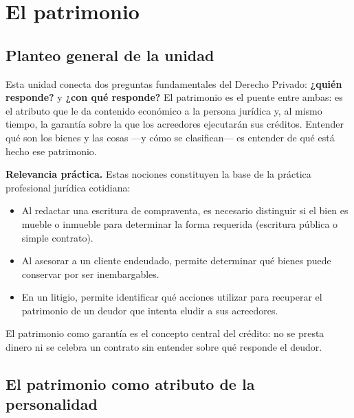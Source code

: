 \documentclass[12pt,oneside]{book}
\begin{document}
\frontmatter
\tableofcontents
\mainmatter

\chapter{El patrimonio}

\section{Planteo general de la unidad}

Esta unidad conecta dos preguntas fundamentales del Derecho Privado: \textbf{¿quién responde?} y \textbf{¿con qué responde?} El patrimonio es el puente entre ambas: es el atributo que le da contenido económico a la persona jurídica y, al mismo tiempo, la garantía sobre la que los acreedores ejecutarán sus créditos. Entender qué son los bienes y las cosas ---y cómo se clasifican--- es entender de qué está hecho ese patrimonio.

\begin{note}
\textbf{Relevancia práctica.} Estas nociones constituyen la base de la práctica profesional jurídica cotidiana:
\begin{itemize}
    \item Al redactar una escritura de compraventa, es necesario distinguir si el bien es mueble o inmueble para determinar la forma requerida (escritura pública o simple contrato).
    \item Al asesorar a un cliente endeudado, permite determinar qué bienes puede conservar por ser inembargables.
    \item En un litigio, permite identificar qué acciones utilizar para recuperar el patrimonio de un deudor que intenta eludir a sus acreedores.
\end{itemize}
El patrimonio como garantía es el concepto central del crédito: no se presta dinero ni se celebra un contrato sin entender sobre qué responde el deudor.
\end{note}

\section{El patrimonio como atributo de la personalidad}
\end{document}
